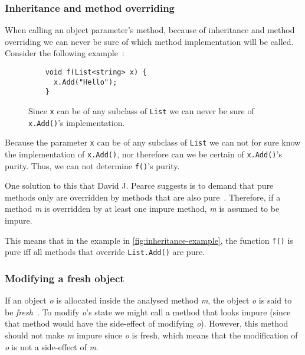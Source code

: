 \documentclass[a4paper,12pt]{article}
\begin{document}
\subsubsection{Inheritance and method overriding} \label{sub:inheritance}

When calling an object parameter's method, because of inheritance and method overriding we can never be sure of which method implementation will be called. Consider the following example~\cite{pearce2011jpure}:

\begin{figure}[H]
  \centering
  \begin{lstlisting}
    void f(List<string> x) {
      x.Add("Hello");
    }
  \end{lstlisting}
  \caption{Since \texttt{x} can be of any subclass of \texttt{List} we can never be sure of \texttt{x.Add()}'s implementation.}
  \label{fig:inheritance-example}
\end{figure}

Because the parameter \texttt{x} can be of any subclass of \texttt{List} we can not for sure know the implementation of \texttt{x.Add()}, nor therefore can we be certain of \texttt{x.Add()}'s purity. Thus, we can not determine \texttt{f()}'s purity.

One solution to this that David J. Pearce suggests is to demand that pure methods only are overridden by methods that are also pure~\cite{pearce2011jpure}. Therefore, if a method \textit{m} is overridden by at least one impure method, \textit{m} is assumed to be impure.

This means that in the example in \autoref{fig:inheritance-example}, the function \texttt{f()} is pure iff all methods that override \texttt{List.Add()} are pure.

\subsubsection{Modifying a fresh object} \label{sub:modifying-fresh-objects}

If an object \textit{o} is allocated inside the analysed method \textit{m}, the object \textit{o} is said to be \textit{fresh}~\cite{pearce2011jpure}. To modify \textit{o}'s state we might call a method that looks impure (since that method would have the side-effect of modifying \textit{o}). However, this method should not make \textit{m} impure since \textit{o} is fresh, which means that the modification of \textit{o} is not a side-effect of \textit{m}.
\end{document}
